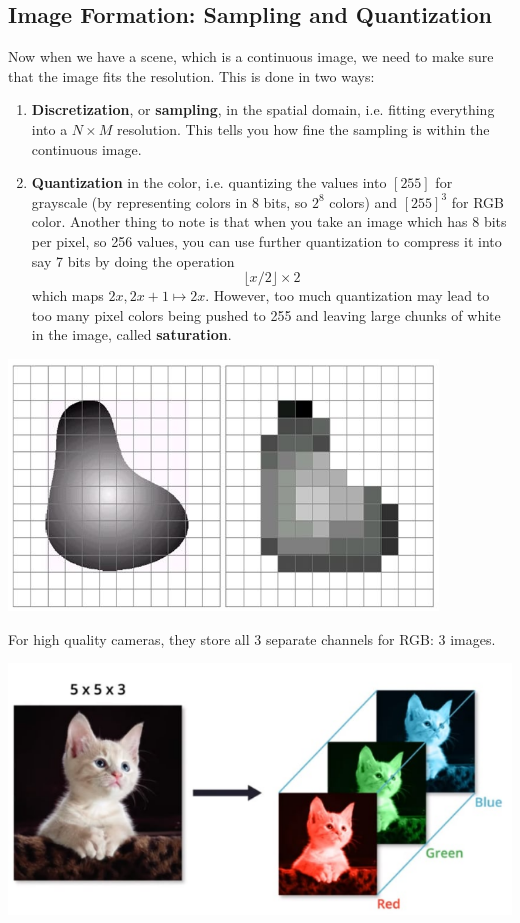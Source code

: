 \documentclass{article}
\begin{document}
  \subsection{Image Formation: Sampling and Quantization}

    Now when we have a scene, which is a continuous image, we need to make sure that the image fits the resolution. This is done in two ways: 
    \begin{enumerate}
      \item \textbf{Discretization}, or \textbf{sampling}, in the spatial domain, i.e. fitting everything into a $N \times M$ resolution. This tells you how fine the sampling is within the continuous image. 
      \item \textbf{Quantization} in the color, i.e. quantizing the values into $[255]$ for grayscale (by representing colors in 8 bits, so $2^8$ colors) and $[255]^3$ for RGB color. Another thing to note is that when you take an image which has 8 bits per pixel, so 256 values, you can use further quantization to compress it into say 7 bits by doing the operation 
      \[\lfloor x/2 \rfloor \times 2\]
      which maps $2x, 2x + 1 \mapsto 2x$. However, too much quantization may lead to too many pixel colors being pushed to 255 and leaving large chunks of white in the image, called \textbf{saturation}. 
    \end{enumerate}
    \begin{center}
        \includegraphics[scale=0.4]{img/discretization_quantization.png}
    \end{center}
    For high quality cameras, they store all 3 separate channels for RGB: 3 images. 
    \begin{center}
        \includegraphics[scale=0.3]{img/RGB_channels.png}
    \end{center}
\end{document}
